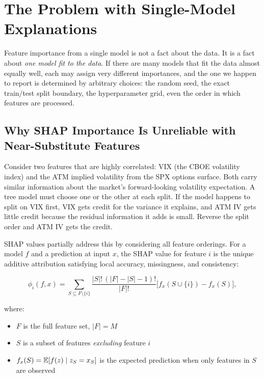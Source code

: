 \section{The Problem with Single-Model Explanations}\label{sec:rashomon:problem}

Feature importance from a single model is not a fact about the data.  It is a
fact about \emph{one model fit to the data}.  If there are many models that
fit the data almost equally well, each may assign very different importances,
and the one we happen to report is determined by arbitrary choices: the random
seed, the exact train/test split boundary, the hyperparameter grid, even the
order in which features are processed.

\subsection{Why SHAP Importance Is Unreliable with Near-Substitute Features}

Consider two features that are highly correlated: VIX (the CBOE volatility
index) and the ATM implied volatility from the SPX options surface.  Both
carry similar information about the market's forward-looking volatility
expectation.  A tree model must choose one or the other at each split.  If the
model happens to split on VIX first, VIX gets credit for the variance it
explains, and ATM IV gets little credit because the residual information it
adds is small.  Reverse the split order and ATM IV gets the credit.

SHAP values \citep{Lundberg2017} partially address this by considering all
feature orderings.  For a model $f$ and a prediction at input $x$, the SHAP
value for feature $i$ is the unique additive attribution satisfying local
accuracy, missingness, and consistency:

\begin{equation}\label{eq:rashomon:shap}
  \phi_i(f, x) = \sum_{S \subseteq F \setminus \{i\}}
    \frac{|S|!\,(|F| - |S| - 1)!}{|F|!}
    \bigl[f_x(S \cup \{i\}) - f_x(S)\bigr],
\end{equation}

\noindent where:
\begin{itemize}[leftmargin=1.8em]
  \item $F$ is the full feature set, $|F| = M$
  \item $S$ is a subset of features \emph{excluding} feature $i$
  \item $f_x(S) = \mathbb{E}[f(z) \mid z_S = x_S]$ is the expected prediction when
    only features in $S$ are observed
\end{itemize}

